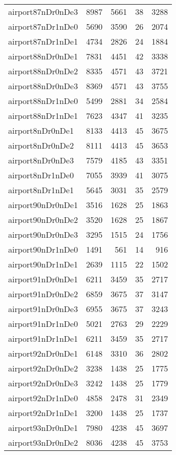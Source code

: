 \begin{longtable}{lrrrr}
airport87nDr0nDe3 & 8987 & 5661 & 38 & 3288 \\
airport87nDr1nDe0 & 5690 & 3590 & 26 & 2074 \\
airport87nDr1nDe1 & 4734 & 2826 & 24 & 1884 \\
airport88nDr0nDe1 & 7831 & 4451 & 42 & 3338 \\
airport88nDr0nDe2 & 8335 & 4571 & 43 & 3721 \\
airport88nDr0nDe3 & 8369 & 4571 & 43 & 3755 \\
airport88nDr1nDe0 & 5499 & 2881 & 34 & 2584 \\
airport88nDr1nDe1 & 7623 & 4347 & 41 & 3235 \\
airport8nDr0nDe1 & 8133 & 4413 & 45 & 3675 \\
airport8nDr0nDe2 & 8111 & 4413 & 45 & 3653 \\
airport8nDr0nDe3 & 7579 & 4185 & 43 & 3351 \\
airport8nDr1nDe0 & 7055 & 3939 & 41 & 3075 \\
airport8nDr1nDe1 & 5645 & 3031 & 35 & 2579 \\
airport90nDr0nDe1 & 3516 & 1628 & 25 & 1863 \\
airport90nDr0nDe2 & 3520 & 1628 & 25 & 1867 \\
airport90nDr0nDe3 & 3295 & 1515 & 24 & 1756 \\
airport90nDr1nDe0 & 1491 & 561 & 14 & 916 \\
airport90nDr1nDe1 & 2639 & 1115 & 22 & 1502 \\
airport91nDr0nDe1 & 6211 & 3459 & 35 & 2717 \\
airport91nDr0nDe2 & 6859 & 3675 & 37 & 3147 \\
airport91nDr0nDe3 & 6955 & 3675 & 37 & 3243 \\
airport91nDr1nDe0 & 5021 & 2763 & 29 & 2229 \\
airport91nDr1nDe1 & 6211 & 3459 & 35 & 2717 \\
airport92nDr0nDe1 & 6148 & 3310 & 36 & 2802 \\
airport92nDr0nDe2 & 3238 & 1438 & 25 & 1775 \\
airport92nDr0nDe3 & 3242 & 1438 & 25 & 1779 \\
airport92nDr1nDe0 & 4858 & 2478 & 31 & 2349 \\
airport92nDr1nDe1 & 3200 & 1438 & 25 & 1737 \\
airport93nDr0nDe1 & 7980 & 4238 & 45 & 3697 \\
airport93nDr0nDe2 & 8036 & 4238 & 45 & 3753 \\

\end{longtable}

